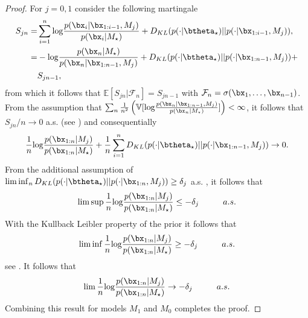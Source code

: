 \documentclass[11pt]{article}
\def\log{{\rm log}}
\begin{document}
\begin{proof}
  For $j=0,1$ consider the following martingale
  \begin{align*}
    \label{eq:walker_martingale}
    S_{jn} =& \sum_{i=1}^{n} \log \frac{p(\bx_i|\bx_{1:i-1},M_j)}{p(\bx_i|M_\star)} + D_{KL}(p(\cdot|\btheta_\star)||p(\cdot|\bx_{1:i-1}, M_j) ),\\
    =& -\log \frac{p(\bx_n|M_\star)}{p(\bx_n|\bx_{1:n-1},M_j)} + D_{KL}(p(\cdot|\btheta_\star)||p(\cdot|\bx_{1:n-1}, M_j) ) +\\
    &S_{jn-1},\\
  \end{align*}
  from which it follows that $\mathbb{E}[S_{jn}|\mathcal{F}_n] = S_{jn-1}$ with $\mathcal{F}_n = \sigma(\bx_1,\dots,\bx_{n-1})$.
From the assumption that  $\sum_n \frac{1}{n^2} \left( \mathbb{V}[\log \frac{p(\bx_n|\bx_{1:n-1},M_j)}{p(\bx_n|M_\star )}]\right) < \infty$, it follows that $S_{jn}/n \rightarrow 0$ a.s. (see \cite {loeve})
and consequentially
  \begin{align*}
    \frac{1}{n} \log \frac{p(\bx_{1:n}|M_j)}{p(\bx_{1:n}|M_\star)} + \frac{1}{n}\sum_{i=1}^n  D_{KL}(p(\cdot|\btheta_\star)||p(\cdot|\bx_{1:n-1}, M_j) )\rightarrow 0.
  \end{align*}
  From the additional assumption of $\lim \inf_n D_{KL}(p(\cdot|\btheta_\star)||p(\cdot|\bx_{1:n}, M_j) ) \geq \delta_j$ a.s.
, it follows that
  \begin{align*}
    \lim \sup   \frac{1}{n} \log \frac{p(\bx_{1:n}|M_j)}{p(\bx_{1:n}|M_\star)} \leq - \delta_j \hspace{1cm} a.s.
  \end{align*}
  With the Kullback Leibler property of the prior it follows that
  \begin{align*}
     \lim \inf   \frac{1}{n} \log \frac{p(\bx_{1:n}|M_j)}{p(\bx_{1:n}|M_\star)} \geq - \delta_j \hspace{1cm} a.s.
  \end{align*}
  see \cite{barron}.
It follows that
    \begin{align*}
     \lim   \frac{1}{n} \log \frac{p(\bx_{1:n}|M_j)}{p(\bx_{1:n}|M_\star)} \rightarrow - \delta_j \hspace{1cm} a.s.
    \end{align*}
    Combining this result for models $M_1$ and $M_0$ completes the proof.
\end{proof}
\end{document}
